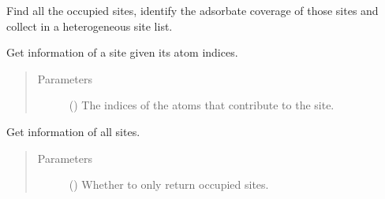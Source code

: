 \documentclass[letterpaper,10pt,english]{sphinxmanual}
\begin{document}
\begin{fulllineitems}
\begin{fulllineitems}
\label{\detokenize{modules:acat.adsorbate_coverage.SlabAdsorbateCoverage.populate_occupied_sites}}
Find all the occupied sites, identify the adsorbate coverage
of those sites and collect in a heterogeneous site list.

\end{fulllineitems}


\begin{fulllineitems}
\label{\detokenize{modules:acat.adsorbate_coverage.SlabAdsorbateCoverage.get_site}}
Get information of a site given its atom indices.
\begin{quote}\begin{description}
\item[{Parameters}] \leavevmode
{} () \textendash{} The indices of the atoms that contribute to the site.

\end{description}\end{quote}

\end{fulllineitems}


\begin{fulllineitems}
\label{\detokenize{modules:acat.adsorbate_coverage.SlabAdsorbateCoverage.get_sites}}
Get information of all sites.
\begin{quote}\begin{description}
\item[{Parameters}] \leavevmode
{} (\sphinxstyleliteralemphasis{\sphinxupquote{, }}) \textendash{} Whether to only return occupied sites.


\end{description}
\end{quote}
\end{fulllineitems}
\end{fulllineitems}
\end{document}
